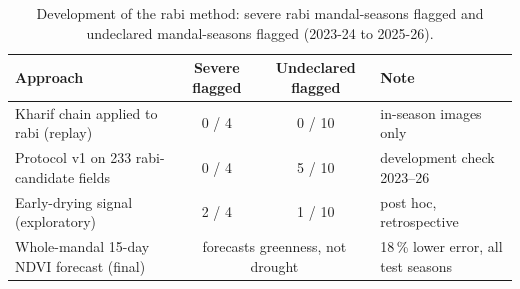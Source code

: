 \begin{table}[H]
\centering
\caption{Development of the rabi method: severe rabi mandal-seasons flagged and undeclared mandal-seasons flagged (2023-24 to 2025-26).}
\label{tab:r_history}
\footnotesize
\begin{tabular}{@{}lccl@{}}
\toprule
\textbf{Approach} & \textbf{Severe flagged} & \textbf{Undeclared flagged} & \textbf{Note} \\
\midrule
Kharif chain applied to rabi (replay) & 0 / 4 & 0 / 10 & in-season images only \\
Protocol v1 on 233 rabi-candidate fields & 0 / 4 & 5 / 10 & development check 2023--26 \\
Early-drying signal (exploratory) & 2 / 4 & 1 / 10 & post hoc, retrospective \\
Whole-mandal 15-day NDVI forecast (final) & \multicolumn{2}{c}{forecasts greenness, not drought} & 18\,\% lower error, all test seasons \\
\bottomrule
\end{tabular}
\end{table}
